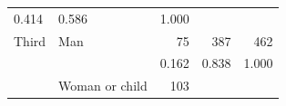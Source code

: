 \documentclass[11pt,a4paper,openany]{book}
\begin{document}
\begin{longtable}[]{@{}llrrr@{}}
\begin{minipage}[t]{0.27\columnwidth}
0.414\strut
\end{minipage} & \begin{minipage}[t]{0.07\columnwidth}\raggedleft\strut
0.586\strut
\end{minipage} & \begin{minipage}[t]{0.07\columnwidth}\raggedleft\strut
1.000\strut
\end{minipage}\tabularnewline
\begin{minipage}[t]{0.30\columnwidth}\raggedright\strut
Third\strut
\end{minipage} & \begin{minipage}[t]{0.14\columnwidth}\raggedright\strut
Man\strut
\end{minipage} & \begin{minipage}[t]{0.27\columnwidth}\raggedleft\strut
75\strut
\end{minipage} & \begin{minipage}[t]{0.07\columnwidth}\raggedleft\strut
387\strut
\end{minipage} & \begin{minipage}[t]{0.07\columnwidth}\raggedleft\strut
462\strut
\end{minipage}\tabularnewline
\begin{minipage}[t]{0.30\columnwidth}\raggedright\strut
\strut
\end{minipage} & \begin{minipage}[t]{0.14\columnwidth}\raggedright\strut
\strut
\end{minipage} & \begin{minipage}[t]{0.27\columnwidth}\raggedleft\strut
0.162\strut
\end{minipage} & \begin{minipage}[t]{0.07\columnwidth}\raggedleft\strut
0.838\strut
\end{minipage} & \begin{minipage}[t]{0.07\columnwidth}\raggedleft\strut
1.000\strut
\end{minipage}\tabularnewline
\begin{minipage}[t]{0.30\columnwidth}\raggedright\strut
\strut
\end{minipage} & \begin{minipage}[t]{0.14\columnwidth}\raggedright\strut
Woman or child\strut
\end{minipage} & \begin{minipage}[t]{0.27\columnwidth}\raggedleft\strut
103\strut
\end{minipage} & \begin{minipage}[t]{0.07\columnwidth}\raggedleft\strut

\end{minipage}
\end{longtable}
\end{document}
